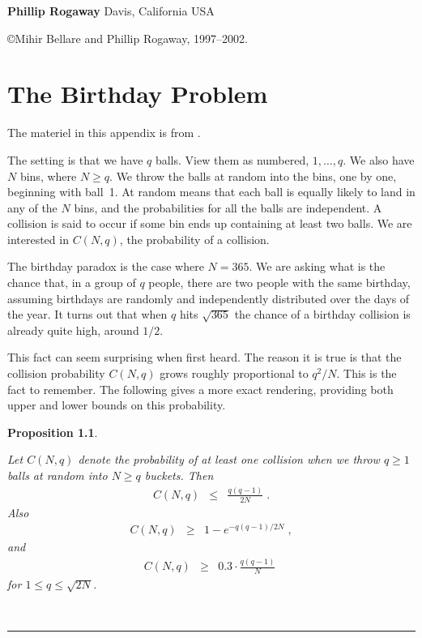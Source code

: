 \documentclass[11pt,twoside]{book}
\newtheorem{propo}[thm]{Proposition}
\newenvironment{proposition}{\begin{propo}\begin{em}}%
{\end{em}~\qedsym\end{propo}}
\def\qedsym{{\hspace{0pt}\rule[-1pt]{3pt}{9pt}}}
\begin{document}
\noindent \textbf{Phillip Rogaway} \hfill Davis, California USA

\vspace{0.7in}

\noindent \copyright Mihir Bellare and Phillip Rogaway, 1997--2002.

\newpage
\tableofcontents
\newpage


\appendix

\chapter{The Birthday Problem}         \label{ap-birthday} 



The materiel in this appendix is from \cite{bkr}.

The setting is that we have $q$ balls. View them as numbered, $1,\ldots,q$.  We
also have $N$ bins, where $N\geq q$. We throw the balls at random into the
bins, one by one, beginning with ball~1. At random means that each ball is
equally likely to land in any of the $N$ bins, and the probabilities for 
all the balls are independent. A collision is said to occur if some bin
ends up containing at least two balls. We are interested in $C(N,q)$, 
the probability of a collision.

The birthday paradox is the case where $N=365$. We are asking what is the
chance that, in a group of $q$ people, there are two people with the same
birthday, assuming birthdays are randomly and independently distributed
over the days of the year. It turns out that when $q$ hits $\sqrt{365}$
the chance of a birthday collision is already quite high, around $1/2$.

This fact can seem surprising when first heard.  The reason it is true is that
the collision probability $C(N,q)$ grows roughly proportional to $q^2/N$. This
is the fact to remember. The following gives a more exact rendering, providing
both upper and lower bounds on this probability.

\begin{proposition}\label{fc-bday} Let $C(N,q)$ denote the probability of at 
least one collision when we throw $q\geq 1$ balls at random into $N\geq q$
buckets.  Then
\begin{eqnarray*}
     C(N,q) & \leq & \frac{q(q-1)}{2N} \;.
\end{eqnarray*}
Also
\begin{eqnarray*}
     C(N,q) & \geq & 1- e^{-q(q-1)/2N} \;,
\end{eqnarray*}
and 
\begin{eqnarray*}
 C(N,q) & \geq & 0.3 \cdot \frac{q(q-1)}{N} \;
\end{eqnarray*}
for $1\leq q\leq\sqrt{2N}$.
\end{proposition} 
\end{document}
